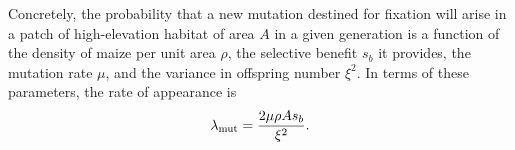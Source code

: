 

Concretely, the probability that a new mutation destined for fixation
will arise in a patch of high-elevation habitat of area $A$ in a given generation
is a function of the density of maize per unit area $\rho$,
the selective benefit $s_b$ it provides,
the mutation rate $\mu$,
and the variance in offspring number $\xi^2$.
In terms of these parameters, the rate of appearance is
\begin{align} \label{eqn:mutrate}
  \lambda_{\text{mut}} = \frac{2 \mu \rho A s_b}{\xi^2} .
\end{align}

